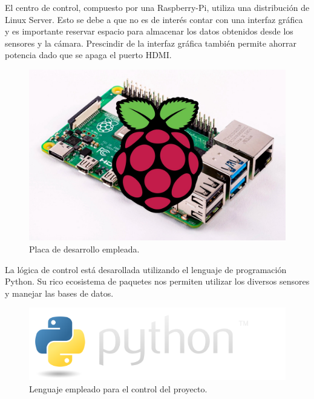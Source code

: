 El centro de control, compuesto por una Raspberry-Pi, utiliza una distribución de Linux Server. Esto se debe a que no es de interés contar con una interfaz gráfica y es importante reservar espacio para almacenar los datos obtenidos desde los sensores y la cámara. 
Prescindir de la interfaz gráfica también permite ahorrar potencia dado que se apaga el puerto HDMI.

\begin{figure}[H]
	\centering
	\includegraphics[width=0.7\linewidth]{"../Ingenieria de Detalle/ImagenesIngenieria de Detalle/rpi_with_board"}
	\caption{Placa de desarrollo empleada.}
	\label{fig:rpiwhiteboard}
\end{figure}



La lógica de control está desarollada utilizando el lenguaje de programación Python. Su rico ecosistema de paquetes nos permiten utilizar los diversos sensores y manejar las bases de datos.

\begin{figure}[H]
	\centering
	\includegraphics[width=0.7\linewidth]{"../Ingenieria de Detalle/ImagenesIngenieria de Detalle/python-logo@2x"}
	\caption{Lenguaje empleado para el control del proyecto.}
	\label{fig:python-logo2x}
\end{figure}










